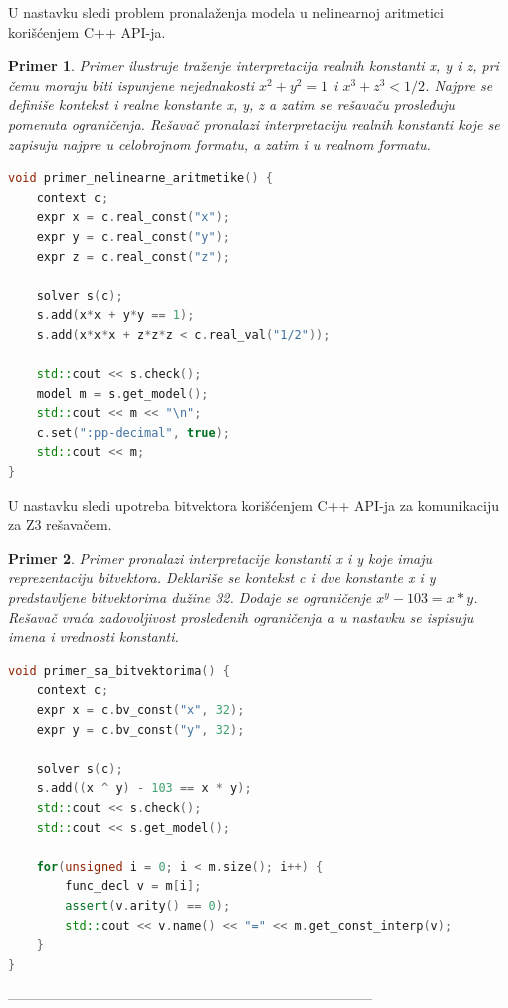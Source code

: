 \documentclass[12pt,oneside]{memoir}
\newtheorem{primer}{Primer}
\begin{document}
U nastavku sledi problem pronalaženja modela u nelinearnoj aritmetici korišćenjem C++ API-ja. 
\begin{primer}
Primer ilustruje traženje interpretacija realnih konstanti x, y i z, pri čemu moraju biti ispunjene nejednakosti \(x^2 + y^2 = 1\) i \(x^3 + z^3 < 1/2\). Najpre se definiše kontekst i realne konstante x, y, z a zatim se rešavaču prosleđuju pomenuta ograničenja. Rešavač pronalazi interpretaciju realnih konstanti koje se zapisuju najpre u celobrojnom formatu, a zatim i u realnom formatu.
\\
\begin{lstlisting}[language=C++]
void primer_nelinearne_aritmetike() {    
    context c;
    expr x = c.real_const("x");
    expr y = c.real_const("y");
    expr z = c.real_const("z");
                     
    solver s(c);
    s.add(x*x + y*y == 1);                    
    s.add(x*x*x + z*z*z < c.real_val("1/2"));  
    
    std::cout << s.check();
    model m = s.get_model();
    std::cout << m << "\n";
    c.set(":pp-decimal", true); 
    std::cout << m;
}
\end{lstlisting}
\end{primer}

U nastavku sledi upotreba bitvektora korišćenjem C++ API-ja za komunikaciju za Z3 rešavačem.
\begin{primer} Primer pronalazi interpretacije konstanti x i y koje imaju reprezentaciju bitvektora. Deklariše se kontekst c i dve konstante x i y predstavljene bitvektorima dužine 32. Dodaje se ograničenje \(x^y - 103 = x*y\). Rešavač vraća zadovoljivost prosleđenih ograničenja a u nastavku se ispisuju imena i vrednosti konstanti.
\begin{lstlisting}[language=C++]
void primer_sa_bitvektorima() {
    context c;
    expr x = c.bv_const("x", 32);
    expr y = c.bv_const("y", 32);

    solver s(c);
    s.add((x ^ y) - 103 == x * y);
    std::cout << s.check();
    std::cout << s.get_model();
    
    for(unsigned i = 0; i < m.size(); i++) {
        func_decl v = m[i];
        assert(v.arity() == 0); 
        std::cout << v.name() << "=" << m.get_const_interp(v);
    }
}

\end{lstlisting}
\end{primer}

------------------------------------------------------------------------------
\end{document}
